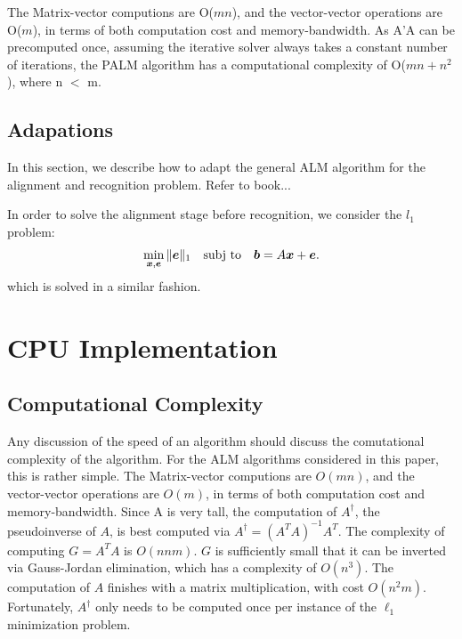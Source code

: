 \documentclass[10pt,twocolumn,letterpaper]{article}
\begin{document}
The Matrix-vector computions are O($mn$), and the vector-vector operations are O($m$), 
in terms of both computation cost and memory-bandwidth.  As A'A can be precomputed once, assuming the iterative solver always takes a constant number of iterations, the PALM algorithm has a computational complexity of O($mn+n^2$), where n $<$ m.


\subsection{Adapations}

In this section, we describe how to adapt the general ALM algorithm for the alignment and recognition problem.  Refer to book...

In order to solve the alignment stage before recognition, we consider the $l_1$ problem: 
\begin{equation} 
\min_{{\boldsymbol{x}}, \boldsymbol{e}} \|\boldsymbol{e}\|_1 \quad \textup{subj to} \quad \boldsymbol{b} = A {\boldsymbol{x}} + \boldsymbol{e}.
\end{equation}
which is solved in a similar fashion.

\section{CPU Implementation}

\subsection{Computational Complexity} Any discussion of the speed of an
algorithm should discuss the comutational complexity of the algorithm.  For the
ALM algorithms considered in this paper, this is rather simple.  The
Matrix-vector computions are $O(mn)$, and the vector-vector operations are
$O(m)$, in terms of both computation cost and memory-bandwidth.  Since A is
very tall, the computation of $A^\dagger$, the pseudoinverse of $A$, is best
computed via $A^\dagger = (A^TA)^{-1} A^T$.  The complexity of computing $G =
A^T A$ is $O(nnm)$.  $G$ is sufficiently small that it can be inverted via
Gauss-Jordan elimination, which has a complexity of $O(n^3)$.  The computation
of $A$ finishes with a matrix multiplication, with cost $O(n^2 m)$.
Fortunately, $A^\dagger$ only needs to be computed once per instance of the
$\ell_1$ minimization problem.
\end{document}
